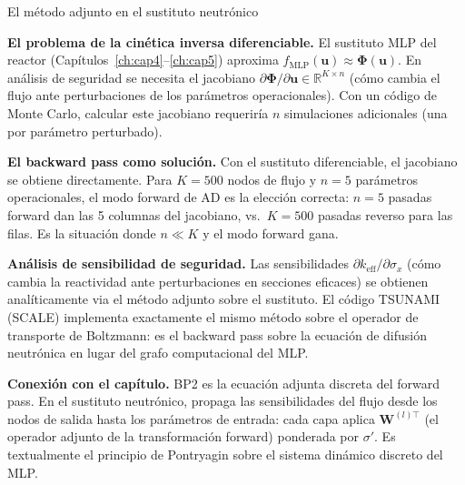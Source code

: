 \begin{estrella}{El método adjunto en el sustituto neutrónico}
\label{sec:estrella6}

\textbf{El problema de la cinética inversa diferenciable.}
El sustituto MLP del reactor (Capítulos~\ref{ch:cap4}--\ref{ch:cap5})
aproxima $f_{\text{MLP}}(\bm{u}) \approx \bm{\Phi}(\bm{u})$. En
análisis de seguridad se necesita el jacobiano
$\partial\bm{\Phi}/\partial\bm{u} \in \mathbb{R}^{K \times n}$ (cómo
cambia el flujo ante perturbaciones de los parámetros operacionales). Con
un código de Monte Carlo, calcular este jacobiano requeriría $n$
simulaciones adicionales (una por parámetro perturbado).

\textbf{El backward pass como solución.}
Con el sustituto diferenciable, el jacobiano se obtiene directamente.
Para $K = 500$ nodos de flujo y $n = 5$ parámetros operacionales, el modo
forward de AD es la elección correcta: $n = 5$ pasadas forward dan las 5
columnas del jacobiano, vs.\ $K = 500$ pasadas reverso para las filas. Es
la situación donde $n \ll K$ y el modo forward gana.

\textbf{Análisis de sensibilidad de seguridad.}
Las sensibilidades $\partial k_{\text{eff}}/\partial\sigma_x$ (cómo cambia
la reactividad ante perturbaciones en secciones eficaces) se obtienen
analíticamente via el método adjunto sobre el sustituto. El código TSUNAMI
(SCALE) implementa exactamente el mismo método sobre el operador de
transporte de Boltzmann: es el backward pass sobre la ecuación de difusión
neutrónica en lugar del grafo computacional del MLP.

\textbf{Conexión con el capítulo.}
BP2 es la ecuación adjunta discreta del forward pass. En el sustituto
neutrónico, propaga las sensibilidades del flujo desde los nodos de salida
hasta los parámetros de entrada: cada capa aplica $\bm{W}^{(l)\top}$ (el
operador adjunto de la transformación forward) ponderada por $\sigma'$.
Es textualmente el principio de Pontryagin sobre el sistema dinámico
discreto del MLP.
\end{estrella}

\printbibliography[heading=subbibliography]